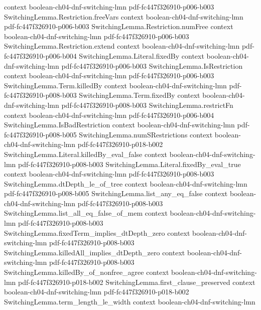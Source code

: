 \begin{theorem}
  {context}
  {boolean-ch04-dnf-switching-lmn}
  {pdf-fc447f326910-p006-b003}
\proofstep
  {SwitchingLemma.Restriction.freeVars}
  {context}
  {boolean-ch04-dnf-switching-lmn}
  {pdf-fc447f326910-p006-b003}
\proofstep
  {SwitchingLemma.Restriction.numFree}
  {context}
  {boolean-ch04-dnf-switching-lmn}
  {pdf-fc447f326910-p006-b003}
\proofstep
  {SwitchingLemma.Restriction.extend}
  {context}
  {boolean-ch04-dnf-switching-lmn}
  {pdf-fc447f326910-p006-b004}
\proofstep
  {SwitchingLemma.Literal.fixedBy}
  {context}
  {boolean-ch04-dnf-switching-lmn}
  {pdf-fc447f326910-p006-b003}
\proofstep
  {SwitchingLemma.IsRestriction}
  {context}
  {boolean-ch04-dnf-switching-lmn}
  {pdf-fc447f326910-p006-b003}
\proofstep
  {SwitchingLemma.Term.killedBy}
  {context}
  {boolean-ch04-dnf-switching-lmn}
  {pdf-fc447f326910-p008-b003}
\proofstep
  {SwitchingLemma.Term.fixedBy}
  {context}
  {boolean-ch04-dnf-switching-lmn}
  {pdf-fc447f326910-p008-b003}
\proofstep
  {SwitchingLemma.restrictFn}
  {context}
  {boolean-ch04-dnf-switching-lmn}
  {pdf-fc447f326910-p006-b004}
\proofstep
  {SwitchingLemma.IsBadRestriction}
  {context}
  {boolean-ch04-dnf-switching-lmn}
  {pdf-fc447f326910-p008-b005}
\proofstep
  {SwitchingLemma.numSRestrictions}
  {context}
  {boolean-ch04-dnf-switching-lmn}
  {pdf-fc447f326910-p018-b002}
\proofstep
  {SwitchingLemma.Literal.killedBy_eval_false}
  {context}
  {boolean-ch04-dnf-switching-lmn}
  {pdf-fc447f326910-p008-b003}
\proofstep
  {SwitchingLemma.Literal.fixedBy_eval_true}
  {context}
  {boolean-ch04-dnf-switching-lmn}
  {pdf-fc447f326910-p008-b003}
\proofstep
  {SwitchingLemma.dtDepth_le_of_tree}
  {context}
  {boolean-ch04-dnf-switching-lmn}
  {pdf-fc447f326910-p008-b005}
\proofstep
  {SwitchingLemma.list_any_eq_false}
  {context}
  {boolean-ch04-dnf-switching-lmn}
  {pdf-fc447f326910-p008-b003}
\proofstep
  {SwitchingLemma.list_all_eq_false_of_mem}
  {context}
  {boolean-ch04-dnf-switching-lmn}
  {pdf-fc447f326910-p008-b003}
\proofstep
  {SwitchingLemma.fixedTerm_implies_dtDepth_zero}
  {context}
  {boolean-ch04-dnf-switching-lmn}
  {pdf-fc447f326910-p008-b003}
\proofstep
  {SwitchingLemma.killedAll_implies_dtDepth_zero}
  {context}
  {boolean-ch04-dnf-switching-lmn}
  {pdf-fc447f326910-p008-b003}
\proofstep
  {SwitchingLemma.killedBy_of_nonfree_agree}
  {context}
  {boolean-ch04-dnf-switching-lmn}
  {pdf-fc447f326910-p018-b002}
\proofstep
  {SwitchingLemma.first_clause_preserved}
  {context}
  {boolean-ch04-dnf-switching-lmn}
  {pdf-fc447f326910-p018-b002}
\proofstep
  {SwitchingLemma.term_length_le_width}
  {context}
  {boolean-ch04-dnf-switching-lmn}

\end{theorem}
